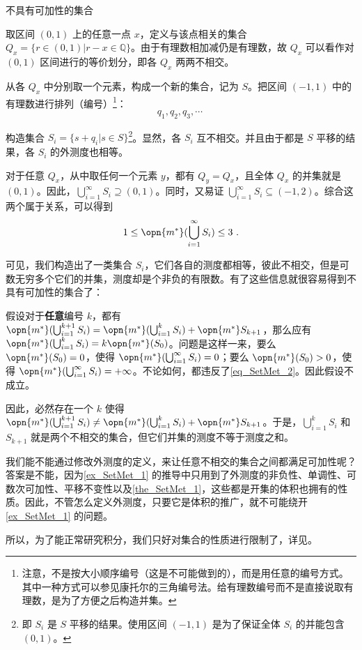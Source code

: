 \begin{example}{不具有可加性的集合}\label{ex_SetMet_1}

取区间 $(0, 1)$ 上的任意一点 $x$，定义与该点相关的集合 $Q_x=\{r\in(0, 1)|r-x\in\mathbb{Q}\}$。由于有理数相加减仍是有理数，故 $Q_x$ 可以看作对 $(0, 1)$ 区间进行的等价划分，即各 $Q_x$ 两两不相交。

从各 $Q_x$ 中分别取一个元素，构成一个新的集合，记为 $S$。把区间 $(-1, 1)$ 中的有理数进行排列（编号）\footnote{注意，不是按大小顺序编号（这是不可能做到的），而是用任意的编号方式。其中一种方式可以参见康托尔的三角编号法。给有理数编号而不是直接说取有理数，是为了方便之后构造并集。}：
\begin{equation}
q_1, q_2, q_3, \cdots ~
\end{equation}

构造集合 $S_i=\{s+q_i|s\in S\}$\footnote{即 $S_i$ 是 $S$ 平移的结果。使用区间 $(-1, 1)$ 是为了保证全体 $S_i$ 的并能包含 $(0, 1)$。}。显然，各 $S_i$ 互不相交。并且由于都是 $S$ 平移的结果，各 $S_i$ 的外测度也相等。

对于任意 $Q_x$，从中取任何一个元素 $y$，都有 $Q_y=Q_x$，且全体 $Q_x$ 的并集就是 $(0, 1)$。因此，$\bigcup_{i=1}^\infty S_i\supseteq (0, 1)$。同时，又易证 $\bigcup_{i=1}^\infty S_i\subseteq (-1, 2)$。综合这两个属于关系，可以得到
\begin{equation}\label{eq_SetMet_2}
1\leq\opn{m^*}(\bigcup_{i=1}^\infty S_i)\leq 3~.
\end{equation}

可见，我们构造出了一类集合 $S_i$，它们各自的测度都相等，彼此不相交，但是可数无穷多个它们的并集，测度却是个非负的有限数。有了这些信息就很容易得到不具有可加性的集合了：

假设对于\textbf{任意}编号 $k$，都有 $\opn{m^*}(\bigcup_{i=1}^{k+1} S_i)=\opn{m^*}(\bigcup_{i=1}^k S_i)+\opn{m^*}S_{k+1}$，那么应有 $\opn{m^*}(\bigcup_{i=1}^{k} S_i)=k\opn{m^*}(S_0)$。问题是这样一来，要么 $\opn{m^*}(S_0)=0$，使得 $\opn{m^*}(\bigcup_{i=1}^\infty S_i)=0$；要么 $\opn{m^*}(S_0)>0$，使得 $\opn{m^*}(\bigcup_{i=1}^\infty S_i)=+\infty$。不论如何，都违反了\autoref{eq_SetMet_2}。因此假设不成立。

因此，必然存在一个 $k$ 使得 $\opn{m^*}(\bigcup_{i=1}^{k+1} S_i) \neq \opn{m^*}(\bigcup_{i=1}^k S_i)+\opn{m^*}S_{k+1}$。于是，$\bigcup_{i=1}^k S_i$ 和 $S_{k+1}$ 就是两个不相交的集合，但它们并集的测度不等于测度之和。


\end{example}

我们能不能通过修改外测度的定义，来让任意不相交的集合之间都满足可加性呢？答案是不能，因为\autoref{ex_SetMet_1} 的推导中只用到了外测度的非负性、单调性、可数次可加性、平移不变性以及\autoref{the_SetMet_1}，这些都是开集的体积也拥有的性质。因此，不管怎么定义外测度，只要它是体积的推广，就不可能绕开\autoref{ex_SetMet_1} 的问题。

所以，为了能正常研究积分，我们只好对集合的性质进行限制了，详见。


















